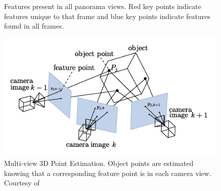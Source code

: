 \documentclass[conference]{IEEEtran}
\begin{document}
\begin{figure}[htb]
\centering
{}
\caption{Features present in all panorama views. Red key points indicate features unique to that frame and blue key points indicate features found in all frames.}
\label{fig:features}
\end{figure}

\begin{figure}[htb]
\centerline{\includegraphics[scale=0.5]{Images/structureFromMotion.png}}
\caption{Multi-view 3D Point Estimation. Object points are estimated knowing that a corresponding feature point is in each camera view. Courtesy of \cite{9}}
\label{fig:3d_points_mvg}
\end{figure}
\end{document}
